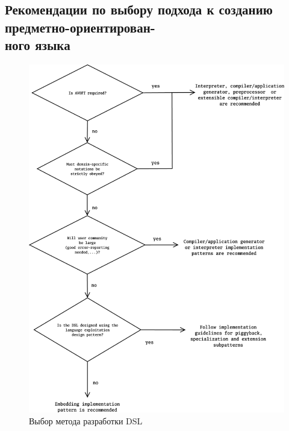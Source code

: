 \begin{appendices}
\section{Рекомендации по выбору подхода \newline  к созданию предметно-ориентирован-\\ного языка}
\label{appendixA}

\begin{figure}[h]
\label{appendix:dslimplapproachguideline}
\centering
\includegraphics[width=\linewidth,height=1.1\linewidth,keepaspectratio]{resources/dsl-implementation-guideline.png}
\caption{Выбор метода разработки DSL~\cite{when-and-how-develop-dsl}}
\end{figure}

\end{appendices}
